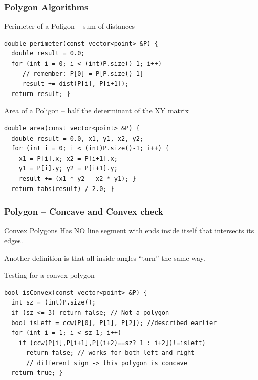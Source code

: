 \documentclass{beamer}
\begin{document}
\begin{frame}[fragile]
  \frametitle{Polygon Algorithms}
  {\smaller
    \begin{exampleblock}{Perimeter of a Poligon -- sum of distances}
\begin{verbatim}
double perimeter(const vector<point> &P) {
  double result = 0.0;
  for (int i = 0; i < (int)P.size()-1; i++) 
     // remember: P[0] = P[P.size()-1]
     result += dist(P[i], P[i+1]);
  return result; }
\end{verbatim}
    \end{exampleblock}

    \begin{exampleblock}{Area of a Poligon -- half the determinant of the XY matrix}
\begin{verbatim}
double area(const vector<point> &P) {
  double result = 0.0, x1, y1, x2, y2;
  for (int i = 0; i < (int)P.size()-1; i++) {
    x1 = P[i].x; x2 = P[i+1].x;
    y1 = P[i].y; y2 = P[i+1].y;
    result += (x1 * y2 - x2 * y1); }
  return fabs(result) / 2.0; }
\end{verbatim}
    \end{exampleblock}

}
\end{frame}


\begin{frame}[fragile]
  \frametitle{Polygon -- Concave and Convex check}
  {\smaller
    \begin{block}{Convex Polygons}
      Has NO line segment with ends inside itself that intersects its
      edges.

      \medskip

      Another definition is that all inside angles ``turn'' the same
      way.      
    \end{block}

    \begin{exampleblock}{Testing for a convex polygon}
\begin{verbatim}
bool isConvex(const vector<point> &P) {
  int sz = (int)P.size();
  if (sz <= 3) return false; // Not a polygon
  bool isLeft = ccw(P[0], P[1], P[2]); //described earlier
  for (int i = 1; i < sz-1; i++)
    if (ccw(P[i],P[i+1],P[(i+2)==sz? 1 : i+2])!=isLeft)
      return false; // works for both left and right
      // different sign -> this polygon is concave
  return true; }
\end{verbatim}
    \end{exampleblock}
  }
\end{frame}
\end{document}
